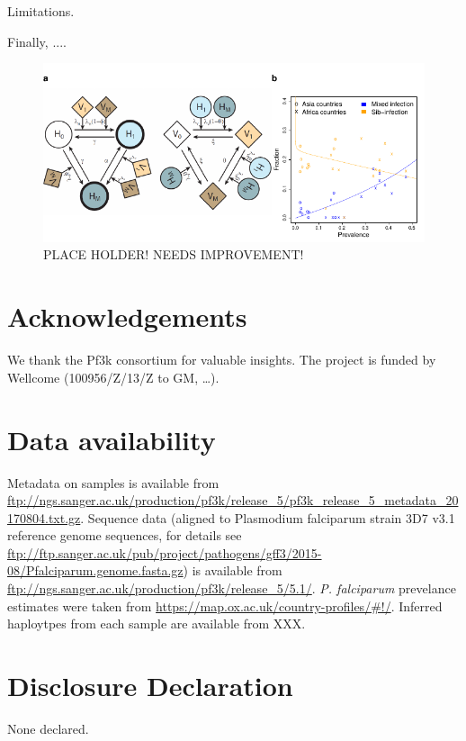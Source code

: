 \documentclass[9pt,lineno]{elife}
\begin{document}
Limitations.

Finally, ....

\begin{figure}[ht]
  \centering{}
  \includegraphics[width=\textwidth]{Fig6.pdf}
  \caption{PLACE HOLDER! NEEDS IMPROVEMENT!}
  \label{fig:NNplot}
\end{figure}




\section{Acknowledgements}
We thank the Pf3k consortium for valuable insights. The project is funded by  Wellcome (100956/Z/13/Z to GM, \ldots).


\section{Data availability}
Metadata on samples is available from \url{ftp://ngs.sanger.ac.uk/production/pf3k/release_5/pf3k_release_5_metadata_20170804.txt.gz}.  Sequence data (aligned to Plasmodium falciparum strain 3D7 v3.1 reference genome sequences, for details see \url{      ftp://ftp.sanger.ac.uk/pub/project/pathogens/gff3/2015-08/Pfalciparum.genome.fasta.gz}) is available from  \url{ftp://ngs.sanger.ac.uk/production/pf3k/release_5/5.1/}.  {\it P. falciparum} prevelance estimates were taken from \url{https://map.ox.ac.uk/country-profiles/#!/}.  Inferred haploytpes from each sample are available from XXX.


\section{Disclosure Declaration}
None declared.



\end{document}
